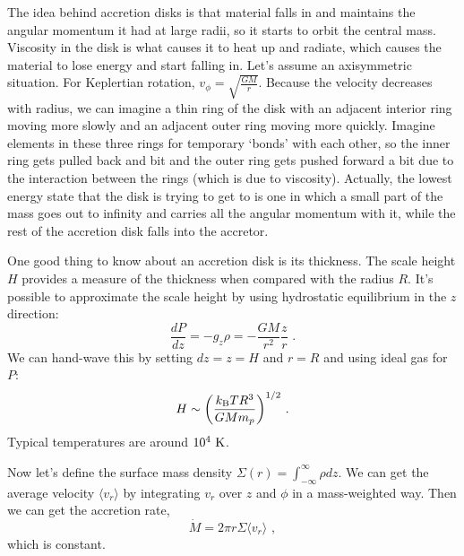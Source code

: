 The idea behind accretion disks is that material falls in and maintains the angular momentum it had at large radii, so it starts to orbit the central mass. Viscosity in the disk is what causes it to heat up and radiate, which causes the material to lose energy and start falling in. Let's assume an axisymmetric situation. For Keplertian rotation, $v_\phi = \sqrt{\frac{GM}{r}}$. Because the velocity decreases with radius, we can imagine a thin ring of the disk with an adjacent interior ring moving more slowly and an adjacent outer ring moving more quickly. Imagine elements in these three rings for temporary `bonds' with each other, so the inner ring gets pulled back and bit and the outer ring gets pushed forward a bit due to the interaction between the rings (which is due to viscosity). Actually, the lowest energy state that the disk is trying to get to is one in which a small part of the mass goes out to infinity and carries all the angular momentum with it, while the rest of the accretion disk falls into the accretor.

One good thing to know about an accretion disk is its thickness. The scale height $H$ provides a measure of the thickness when compared with the radius $R$. It's possible to approximate the scale height by using hydrostatic equilibrium in the $z$ direction:
\begin{equation}
\frac{dP}{dz} = -g_z \rho = -\frac{GM}{r^2} \frac{z}{r}\,\,.
\end{equation}
We can hand-wave this by setting $dz = z = H$ and $r = R$ and using ideal gas for $P$:
\begin{equation}
H \sim \biggl( \frac{k_{\rm B} T R^3}{GM m_p}\biggr)^{1/2}\,\,.
\end{equation}
Typical temperatures are around $10^4~{\rm K}$.

Now let's define the surface mass density $\Sigma(r) = \int^\infty_{-\infty} \rho dz$. We can get the average velocity $\langle v_r \rangle$ by integrating $v_r$ over $z$ and $\phi$ in a mass-weighted way. Then we can get the accretion rate,
\begin{equation}
\dot{M} = 2 \pi r \Sigma \langle v_r \rangle\,\, ,
\end{equation}
which is constant.

